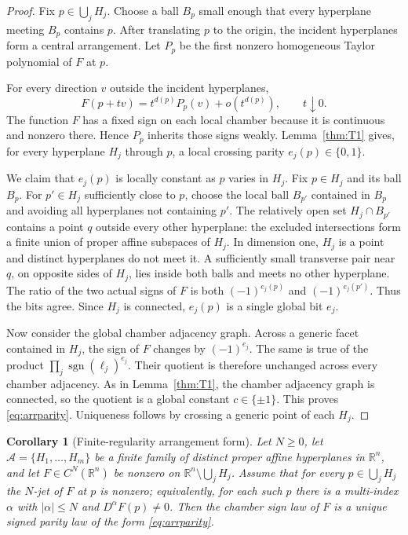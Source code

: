 \documentclass[11pt]{article}
\newtheorem{corollary}[theorem]{Corollary}
\theoremstyle{definition}
\theoremstyle{remark}
\newcommand{\R}{\mathbb{R}}
\newcommand{\bits}{\{0,1\}}
\newcommand{\sign}{\operatorname{sgn}}
\newcommand{\cA}{\mathcal{A}}
\begin{document}
\begin{proof}
Fix $p\in\bigcup_jH_j$. Choose a ball $B_p$ small enough that every hyperplane meeting $B_p$ contains $p$. After translating $p$ to the origin, the incident hyperplanes form a central arrangement. Let $P_p$ be the first nonzero homogeneous Taylor polynomial of $F$ at $p$.

For every direction $v$ outside the incident hyperplanes,
\[
 F(p+tv)=t^{d(p)}P_p(v)+o(t^{d(p)}),
 \qquad t\downarrow0.
\]
The function $F$ has a fixed sign on each local chamber because it is continuous and nonzero there. Hence $P_p$ inherits those signs weakly. Lemma~\ref{thm:T1} gives, for every hyperplane $H_j$ through $p$, a local crossing parity $e_j(p)\in\bits$.

We claim that $e_j(p)$ is locally constant as $p$ varies in $H_j$. Fix $p\in H_j$ and its ball $B_p$. For $p'\in H_j$ sufficiently close to $p$, choose the local ball $B_{p'}$ contained in $B_p$ and avoiding all hyperplanes not containing $p'$. The relatively open set $H_j\cap B_{p'}$ contains a point $q$ outside every other hyperplane: the excluded intersections form a finite union of proper affine subspaces of $H_j$. In dimension one, $H_j$ is a point and distinct hyperplanes do not meet it. A sufficiently small transverse pair near $q$, on opposite sides of $H_j$, lies inside both balls and meets no other hyperplane. The ratio of the two actual signs of $F$ is both $(-1)^{e_j(p)}$ and $(-1)^{e_j(p')}$. Thus the bits agree. Since $H_j$ is connected, $e_j(p)$ is a single global bit $e_j$.

Now consider the global chamber adjacency graph. Across a generic facet contained in $H_j$, the sign of $F$ changes by $(-1)^{e_j}$. The same is true of the product $\prod_j\sign(\ell_j)^{e_j}$. Their quotient is therefore unchanged across every chamber adjacency. As in Lemma~\ref{thm:T1}, the chamber adjacency graph is connected, so the quotient is a global constant $c\in\{\pm1\}$. This proves \eqref{eq:arrparity}. Uniqueness follows by crossing a generic point of each $H_j$.
\end{proof}

\begin{corollary}[Finite-regularity arrangement form]\label{cor:finitearr}
Let $N\ge0$, let $\cA=\{H_1,\dots,H_m\}$ be a finite family of distinct proper affine hyperplanes in $\R^n$, and let $F\in C^N(\R^n)$ be nonzero on $\R^n\setminus\bigcup_jH_j$. Assume that for every $p\in\bigcup_jH_j$ the $N$-jet of $F$ at $p$ is nonzero; equivalently, for each such $p$ there is a multi-index $\alpha$ with $|\alpha|\le N$ and $D^\alpha F(p)\ne0$. Then the chamber sign law of $F$ is a unique signed parity law of the form \eqref{eq:arrparity}.
\end{corollary}
\end{document}
